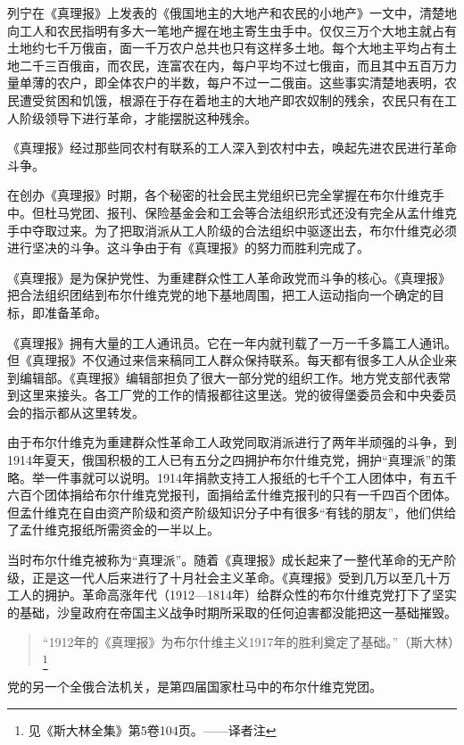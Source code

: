 列宁在《真理报》上发表的《俄国地主的大地产和农民的小地产》一文中，清楚地向工人和农民指明有多大一笔地产握在地主寄生虫手中。仅仅三万个大地主就占有土地约七千万俄亩，面一千万农户总共也只有这样多土地。每个大地主平均占有土地二千三百俄亩，而农民，连富农在内，每户平均不过七俄亩，而且其中五百万力量单薄的农户，即全体农户的半数，每户不过一二俄亩。这些事实清楚地表明，农民遭受贫困和饥饿，根源在于存在着地主的大地产即农奴制的残余，农民只有在工人阶级领导下进行革命，才能摆脱这种残余。

《真理报》经过那些同农村有联系的工人深入到农村中去，唤起先进农民进行革命斗争。

在创办《真理报》时期，各个秘密的社会民主党组织已完全掌握在布尔什维克手中。但杜马党团、报刊、保险基金会和工会等合法组织形式还没有完全从孟什维克手中夺取过来。为了把取消派从工人阶级的合法组织中驱逐出去，布尔什维克必须进行坚决的斗争。这斗争由于有《真理报》的努力而胜利完成了。

《真理报》是为保护党性、为重建群众性工人革命政党而斗争的核心。《真理报》把合法组织团结到布尔什维克党的地下基地周围，把工人运动指向一个确定的目标，即准备革命。

《真理报》拥有大量的工人通讯员。它在一年内就刊载了一万一千多篇工人通讯。但《真理报》不仅通过来信来稿同工人群众保持联系。每天都有很多工人从企业来到编辑部。《真理报》编辑部担负了很大一部分党的组织工作。地方党支部代表常到这里来接头。各工厂党的工作的情报都往这里送。党的彼得堡委员会和中央委员会的指示都从这里转发。

由于布尔什维克为重建群众性革命工人政党同取消派进行了两年半顽强的斗争，到1914年夏天，俄国积极的工人已有五分之四拥护布尔什维克党，拥护“真理派”的策略。举一件事就可以说明。1914年捐款支持工人报纸的七千个工人团体中，有五千六百个团体捐给布尔什维克党报刊，面捐给孟什维克报刊的只有一千四百个团体。但孟什维克在自由资产阶级和资产阶级知识分子中有很多“有钱的朋友”，他们供给了孟什维克报纸所需资金的一半以上。

当时布尔什维克被称为“真理派”。随着《真理报》成长起来了一整代革命的无产阶级，正是这一代人后来进行了十月社会主义革命。《真理报》受到几万以至几十万工人的拥护。革命高涨年代（1912—1814年）给群众性的布尔什维克党打下了坚实的基础，沙皇政府在帝国主义战争时期所采取的任何迫害都没能把这一基础摧毁。

\begin{quotation}
“1912年的《真理报》为布尔什维主义1917年的胜利奠定了基础。”（斯大林）\footnote{见《斯大林全集》第5卷104页。——译者注}
\end{quotation}

党的另一个全俄合法机关，是第四届国家杜马中的布尔什维克党团。

